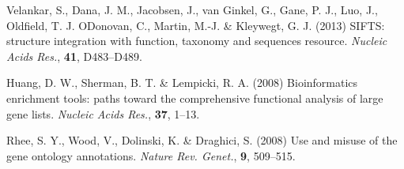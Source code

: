\documentclass[a4paper,numbib, final, twoside, titelpage]{imaiai}%
\begin{document}
\begin{references}
{\sc Velankar, S., Dana, J. M., Jacobsen, J., van Ginkel, G., Gane, P. J., Luo, J.,
  Oldfield, T. J. ODonovan, C., Martin, M.-J. \& Kleywegt, G. J.} (2013) {SIFTS}: structure
  integration with function, taxonomy and sequences resource. \textit{Nucleic Acids
  Res.}, {\bf 41}, D483--D489.

{\sc Huang, D. W., Sherman, B. T. \& Lempicki, R. A.} (2008) Bioinformatics enrichment tools:
  paths toward the comprehensive functional analysis of large gene lists.
  \textit{Nucleic Acids Res.}, {\bf 37}, 1--13.

{\sc Rhee, S. Y., Wood, V., Dolinski, K. \& Draghici, S.} (2008) Use and misuse of the gene
  ontology annotations. \textit{Nature Rev. Genet.}, {\bf 9}, 509--515.
\end{references}
\end{document}
